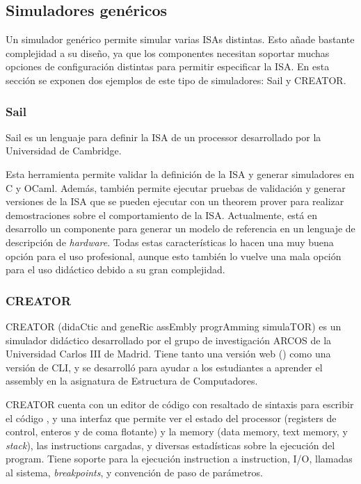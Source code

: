 
\FloatBarrier

\subsection{Simuladores genéricos}

Un simulador genérico permite simular varias \glspl{ISA} distintas. Esto añade
bastante complejidad a su diseño, ya que los componentes necesitan soportar
muchas opciones de configuración distintas para permitir especificar la
\gls{ISA}. En esta sección se exponen dos ejemplos de este tipo de simuladores:
Sail y CREATOR.

\subsubsection{Sail}

Sail \parencite{sail} es un lenguaje para definir la \gls{ISA} de un
\gls{processor} desarrollado por la Universidad de Cambridge.

Esta herramienta permite validar la definición de la \gls{ISA} y generar
simuladores en C y OCaml. Además, también permite ejecutar pruebas de validación
y generar versiones de la \gls{ISA} que se pueden ejecutar con un \gls{theorem
prover} para realizar demostraciones sobre el comportamiento de la \gls{ISA}.
Actualmente, está en desarrollo un componente para generar un modelo de
referencia en un lenguaje de descripción de \textit{hardware}. Todas estas
características lo hacen una muy buena opción para el uso profesional, aunque
esto también lo vuelve una mala opción para el uso didáctico debido a su gran
complejidad.

\subsubsection{CREATOR}

CREATOR (didaCtic and geneRic assEmbly progrAmming simulaTOR)
\parencite{CREATOR} es un simulador didáctico desarrollado por el grupo de
investigación ARCOS de la Universidad Carlos III de Madrid. Tiene tanto una
versión web () como una versión de \gls{CLI}, y se desarrolló
para ayudar a los estudiantes a aprender el \gls{assembly} en la asignatura de
Estructura de Computadores.

CREATOR cuenta con un editor de código con resaltado de sintaxis para escribir
el código , y una interfaz que permite ver el
estado del \gls{processor} (\glspl{register} de control, enteros y de coma
flotante) y la \gls{memory} (\gls{data memory}, \gls{text memory}, y
\textit{stack}), las \glspl{instruction} cargadas, y diversas estadísticas sobre
la ejecución del \gls{program}. Tiene soporte para la ejecución
\gls{instruction} a \gls{instruction}, I/O, llamadas al sistema,
\textit{breakpoints}, y convención de paso de parámetros.

